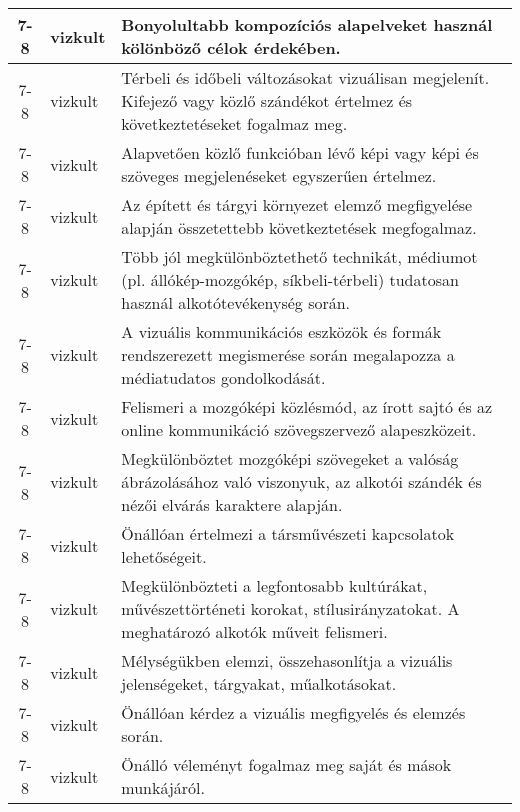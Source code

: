 \begin{small}
\begin{longtable}{c | p{2cm} |  p{11cm} }
              7-8 & vizkult & Bonyolultabb kompozíciós alapelveket használ kölönböző célok érdekében. \\ \hline
              7-8 & vizkult & Térbeli és időbeli változásokat vizuálisan megjelenít. Kifejező vagy közlő szándékot értelmez és következtetéseket fogalmaz meg. \\ \hline
              7-8 & vizkult & Alapvetően közlő funkcióban lévő képi vagy képi és szöveges megjelenéseket egyszerűen értelmez. \\ \hline
              7-8 & vizkult & Az épített és tárgyi környezet elemző megfigyelése alapján összetettebb következtetések megfogalmaz. \\ \hline
              7-8 & vizkult & Több jól megkülönböztethető technikát, médiumot (pl. állókép-mozgókép, síkbeli-térbeli) tudatosan használ alkotótevékenység során. \\ \hline
              7-8 & vizkult & A vizuális kommunikációs eszközök és formák rendszerezett megismerése során megalapozza a médiatudatos gondolkodását. \\ \hline
              7-8 & vizkult & Felismeri a mozgóképi közlésmód, az írott sajtó és az online kommunikáció szövegszervező alapeszközeit. \\ \hline
              7-8 & vizkult & Megkülönböztet mozgóképi szövegeket a valóság ábrázolásához való viszonyuk, az alkotói szándék és nézői elvárás karaktere alapján. \\ \hline
              7-8 & vizkult & Önállóan értelmezi a társművészeti kapcsolatok lehetőségeit. \\ \hline
              7-8 & vizkult & Megkülönbözteti a legfontosabb kultúrákat, művészettörténeti korokat, stílusirányzatokat. A meghatározó alkotók műveit felismeri. \\ \hline
              7-8 & vizkult & Mélységükben elemzi, összehasonlítja a vizuális jelenségeket, tárgyakat, műalkotásokat. \\ \hline
              7-8 & vizkult & Önállóan kérdez a vizuális megfigyelés és elemzés során. \\ \hline
              7-8 & vizkult & Önálló véleményt fogalmaz meg saját és mások munkájáról. \\ \hline
      \end{longtable}
\end{small}


